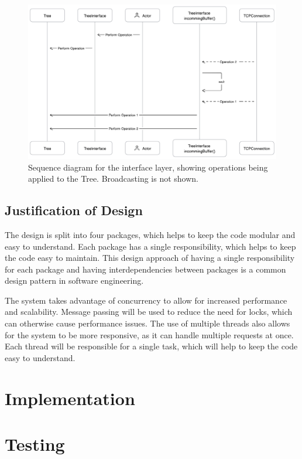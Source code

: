 \documentclass[12pt]{report}
\begin{document}
\begin{figure}[h]
    \centering
    \includegraphics[width=1\textwidth]{treeinterface.png}
    \caption{Sequence diagram for the interface layer, showing operations being applied to the Tree. Broadcasting is not shown.}
    \label{fig:interfaceseq}
\end{figure}


\section{Justification of Design}
The design is split into four packages, which helps to keep the code modular and easy to understand. Each package has a single responsibility, which helps to keep the code easy to maintain. This design approach of having a single responsibility for each package and having interdependencies between packages is a common design pattern in software engineering. \par

The system takes advantage of concurrency to allow for increased performance and scalability. Message passing will be used to reduce the need for locks, which can otherwise cause performance issues. The use of multiple threads also allows for the system to be more responsive, as it can handle multiple requests at once. Each thread will be responsible for a single task, which will help to keep the code easy to understand. \par


\chapter{Implementation}\label{sec:implementation}

\chapter{Testing}
\end{document}

